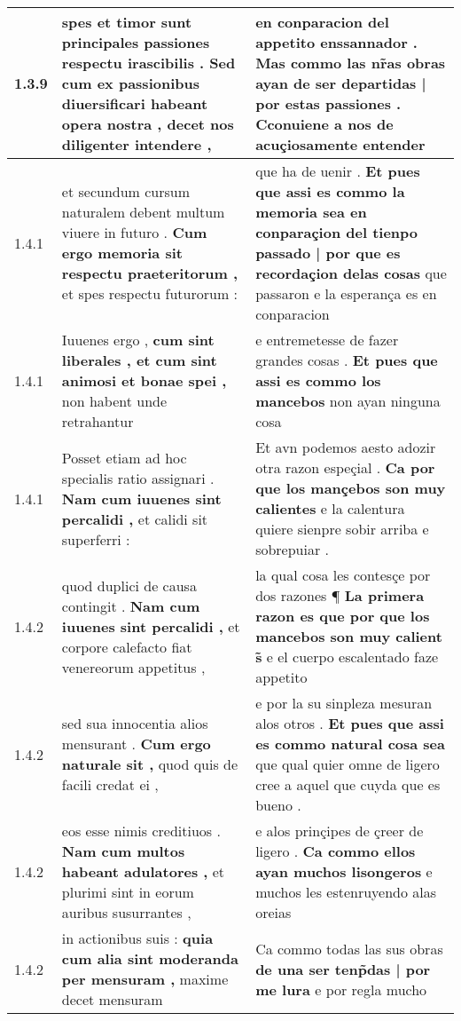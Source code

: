 \begin{tabular}{|p{1cm}|p{6.5cm}|p{6.5cm}|}
1.3.9 & spes et timor sunt principales passiones respectu irascibilis . \textbf{ Sed cum ex passionibus diuersificari habeant opera nostra , } decet nos diligenter intendere , & en conparacion del appetito enssannador . \textbf{ Mas commo las nr̃as obras ayan de ser departidas | por estas passiones . } Cconuiene a nos de acuçiosamente entender \\\hline
1.4.1 & et secundum cursum naturalem debent multum viuere in futuro . \textbf{ Cum ergo memoria sit respectu praeteritorum , } et spes respectu futurorum : & que ha de uenir . \textbf{ Et pues que assi es commo la memoria sea en conparaçion del tienpo passado | por que es recordaçion delas cosas } que passaron e la esperança es en conparacion \\\hline
1.4.1 & Iuuenes ergo , \textbf{ cum sint liberales , et cum sint animosi et bonae spei , } non habent unde retrahantur & e entremetesse de fazer grandes cosas . \textbf{ Et pues que assi es commo los mancebos } non ayan ninguna cosa \\\hline
1.4.1 & Posset etiam ad hoc specialis ratio assignari . \textbf{ Nam cum iuuenes sint percalidi , } et calidi sit superferri : & Et avn podemos aesto adozir otra razon espeçial . \textbf{ Ca por que los mançebos son muy calientes } e la calentura quiere sienpre sobir arriba e sobrepuiar . \\\hline
1.4.2 & quod duplici de causa contingit . \textbf{ Nam cum iuuenes sint percalidi , } et corpore calefacto fiat venereorum appetitus , & la qual cosa les contesçe por dos razones ¶ \textbf{ La primera razon es que por que los mancebos son muy calient s̃ } e el cuerpo escalentado faze appetito \\\hline
1.4.2 & sed sua innocentia alios mensurant . \textbf{ Cum ergo naturale sit , } quod quis de facili credat ei , & e por la su sinpleza mesuran alos otros . \textbf{ Et pues que assi es commo natural cosa sea } que qual quier omne de ligero cree a aquel que cuyda que es bueno . \\\hline
1.4.2 & eos esse nimis creditiuos . \textbf{ Nam cum multos habeant adulatores , } et plurimi sint in eorum auribus susurrantes , & e alos prinçipes de çreer de ligero . \textbf{ Ca commo ellos ayan muchos lisongeros } e muchos les estenruyendo alas oreias \\\hline
1.4.2 & in actionibus suis : \textbf{ quia cum alia sint moderanda per mensuram , } maxime decet mensuram & Ca commo todas las sus obras \textbf{ de una ser tenp̃das | por me lura } e por regla mucho \\\hline

\end{tabular}

